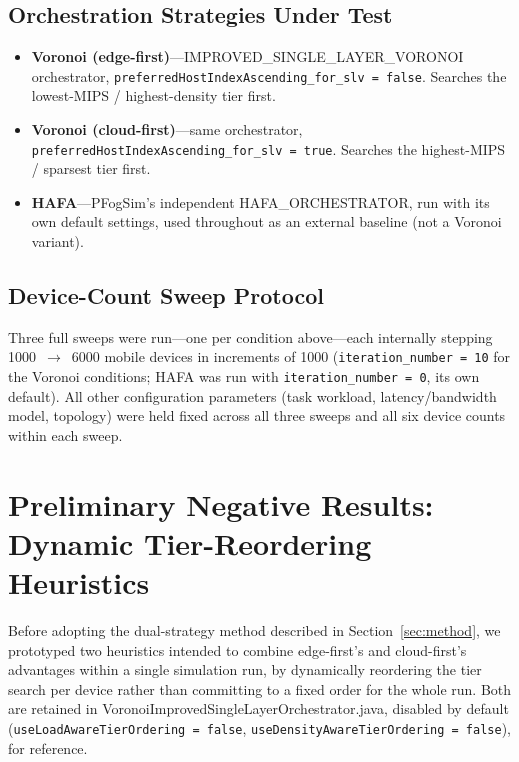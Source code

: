 \documentclass[10pt,conference]{IEEEtran}
\begin{document}
\subsection{Orchestration Strategies Under Test}\label{sub:strategies}
\begin{itemize}
\item \textbf{Voronoi (edge-first)}---IMPROVED\_SINGLE\_LAYER\_VORONOI orchestrator, \texttt{preferredHostIndexAscending\_for\_slv = false}. Searches the lowest-MIPS / highest-density tier first.
\item \textbf{Voronoi (cloud-first)}---same orchestrator, \texttt{preferredHostIndexAscending\_for\_slv = true}. Searches the highest-MIPS / sparsest tier first.
\item \textbf{HAFA}---PFogSim's independent HAFA\_ORCHESTRATOR, run with its own default settings, used throughout as an external baseline (not a Voronoi variant).
\end{itemize}

\subsection{Device-Count Sweep Protocol}\label{sub:protocol}
Three full sweeps were run---one per condition above---each internally stepping 1000~$\rightarrow$~6000 mobile devices in increments of 1000 (\texttt{iteration\_number = 10} for the Voronoi conditions; HAFA was run with \texttt{iteration\_number = 0}, its own default). All other configuration parameters (task workload, latency/bandwidth model, topology) were held fixed across all three sweeps and all six device counts within each sweep.

\section{Preliminary Negative Results: Dynamic Tier-Reordering Heuristics}\label{sec:negative}
Before adopting the dual-strategy method described in Section~\ref{sec:method}, we prototyped two heuristics intended to combine edge-first's and cloud-first's advantages within a single simulation run, by dynamically reordering the tier search per device rather than committing to a fixed order for the whole run. Both are retained in VoronoiImprovedSingleLayerOrchestrator.java, disabled by default (\texttt{useLoadAwareTierOrdering = false}, \texttt{useDensityAwareTierOrdering = false}), for reference.
\end{document}
